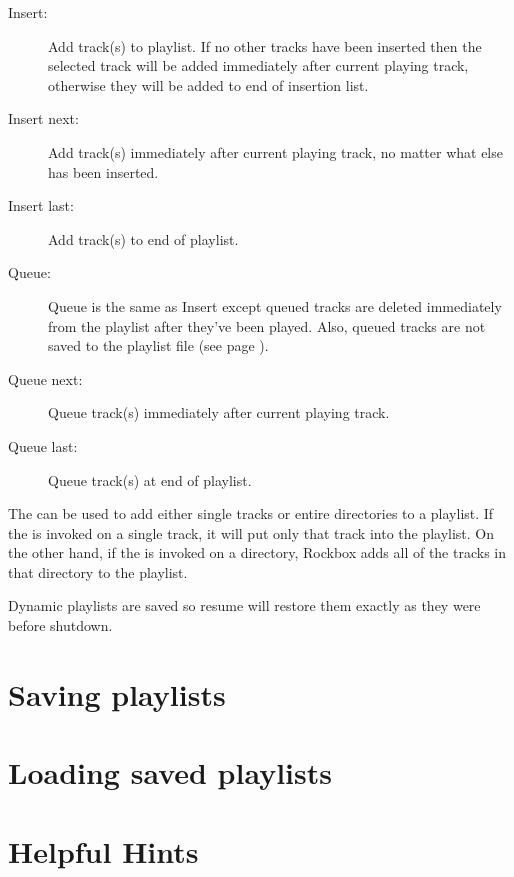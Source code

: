 \begin{description}
{	\begin{description} 
	
	\item [Insert:] Add track(s) to playlist. If no other 
	tracks have been inserted then the selected track will be added immediately 
	after current playing track, otherwise they will be added to end of insertion 
	list. 
	
	\item [Insert next:] Add track(s) immediately after current playing 
	track, no matter what else has been inserted. 
	
	\item [Insert last:] Add track(s) to end of playlist. 
	
	\item [Queue:] Queue is the same as Insert except queued tracks are deleted 
	immediately from the playlist after they've been played. Also, queued tracks 
	are not saved to the playlist file (see page \pageref{ref:playlistoptions}). 
	
	\item [Queue next:] Queue track(s) immediately after current playing track. 
	
	\item [Queue last:] Queue track(s) at end of playlist. \end{description}

The  can be used to add either single tracks or 
entire directories to a playlist. If the  is 
invoked on a single track, it will put only that track into the playlist.  
On the other hand, if the  is invoked on a 
directory, Rockbox adds all of the tracks in that directory to the playlist.  

Dynamic playlists are saved so resume will restore them exactly as they were before
shutdown.

\section{Saving playlists}

\section{Loading saved playlists}

\section{Helpful Hints}

}
\end{description}
